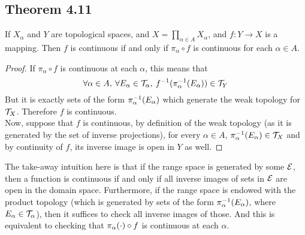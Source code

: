 \documentclass[../../main.tex]{subfiles}
\begin{document}
\subsection{Theorem 4.11}
\begin{wts}
    If $X_\alpha$ and $Y$ are topological spaces, and $X = \prod_{\alpha\in A}X_\alpha$, and $f:Y\to X$ is a mapping. Then $f$ is continuous if and only if $\pi_\alpha\circ f$ is continuous for each $\alpha\in A$.
\end{wts}
\begin{proof}
    If $\pi_\alpha\circ f$ is continuous at each $\alpha$, this means that
    \[
    \forall \alpha\in A, \:\forall E_\alpha\in\mathcal{T}_\alpha,\: f^{-1}(\pi_{\alpha}^{-1}({E_\alpha}))\in \mathcal{T}_Y
    \]
    But it is exactly sets of the form $\pi_{\alpha}^{-1}({E_\alpha})$ which generate the weak topology for $\mathcal{T}_X$. Therefore $f$ is continuous.\\
    
    Now, suppose that $f$ is continuous, by definition of the weak topology (as it is generated by the set of inverse projections), for every $\alpha\in A$, $\pi_{\alpha}^{-1}({E_\alpha})\in \mathcal{T}_X$ and by continuity of $f$, its inverse image is open in $Y$ as well.
\end{proof}
\remark The take-away intuition here is that if the range space is generated by some $\mathcal{E}$, then a function is continuous if and only if all inverse images of sets in $\mathcal{E}$ are open in the domain space. Furthermore, if the range space is endowed with the product topology (which is generated by sets of the form $\pi_{\alpha}^{-1}({E_\alpha})$, where $E_\alpha\in \mathcal{T}_\alpha$), then it suffices to check all inverse images of those. And this is equivalent to checking that $\pi_{\alpha}({\cdot})\circ f$ is continuous at each $\alpha$.
\end{document}
